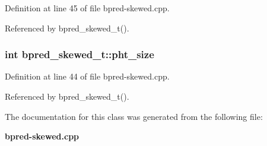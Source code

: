 Definition at line 45 of file bpred-skewed.cpp.

Referenced by bpred\_\-skewed\_\-t().
\subsubsection[{pht\_\-size}]{\setlength{\rightskip}{0pt plus 5cm}int {\bf bpred\_\-skewed\_\-t::pht\_\-size}\hspace{0.3cm}{\tt  [protected]}}\label{classbpred__skewed__t_e6567fd955bde0079e41d8797a1610af}




Definition at line 44 of file bpred-skewed.cpp.

Referenced by bpred\_\-skewed\_\-t().

The documentation for this class was generated from the following file:\begin{CompactItemize}
\item 
{\bf bpred-skewed.cpp}\end{CompactItemize}
